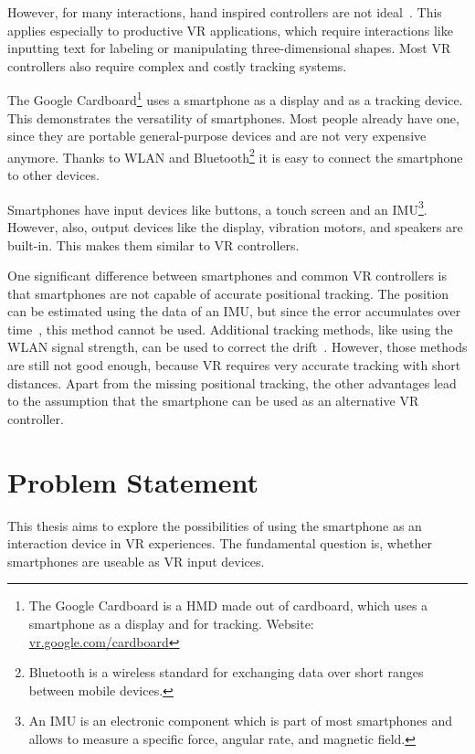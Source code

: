 However, for many interactions, hand inspired controllers are not ideal~\cite{Bowman.2012}. This applies especially to productive \gls{VR} applications, which require interactions like inputting text for labeling or manipulating three-dimensional shapes. Most \gls{VR} controllers also require complex and costly tracking systems.


The Google Cardboard\footnote{The Google Cardboard is a \gls{HMD} made out of cardboard, which uses a smartphone as a display and for tracking. Website: \href{https://vr.google.com/cardboard/}{vr.google.com/cardboard}} uses a smartphone as a display and as a tracking device. This demonstrates the versatility of smartphones. Most people already have one, since they are portable general-purpose devices and are not very expensive anymore. Thanks to \gls{WLAN} and Bluetooth\footnote{Bluetooth is a wireless standard for exchanging data over short ranges between mobile devices.} it is easy to connect the smartphone to other devices.

Smartphones have input devices like buttons, a touch screen and an \gls{IMU}\footnote{An IMU is an electronic component which is part of most smartphones and allows to measure a specific force, angular rate, and magnetic field.}. However, also, output devices like the display, vibration motors, and speakers are built-in. This makes them similar to \gls{VR} controllers.

One significant difference between smartphones and common \gls{VR} controllers is that smartphones are not capable of accurate positional tracking. The position can be estimated using the data of an \gls{IMU}, but since the error accumulates over time~\cite[44]{Steed.2013}, this method cannot be used. Additional tracking methods, like using the \gls{WLAN} signal strength, can be used to correct the drift~\cite{Zhang.2015}. However, those methods are still not good enough, because \gls{VR} requires very accurate tracking with short distances.
Apart from the missing positional tracking, the other advantages lead to the assumption that the smartphone can be used as an alternative \gls{VR} controller.


\section{Problem Statement}\label{section:problem-statement}
This thesis aims to explore the possibilities of using the smartphone as an interaction device in \gls{VR} experiences. The fundamental question is, whether smartphones are useable as \gls{VR} input devices.

